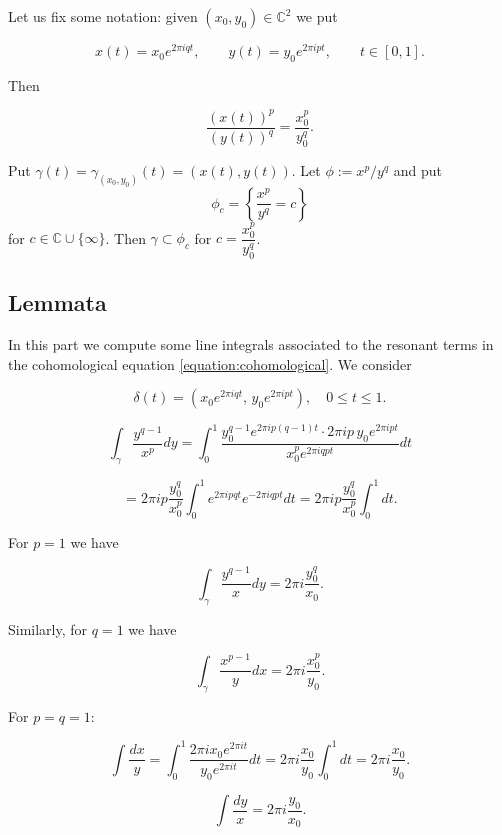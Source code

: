 \documentclass[11pt,a4paper]{amsart}
\theoremstyle{definition}
\begin{document}
Let us fix some notation:
given $(x_0,y_0)\in\mathbb{C}^2$ we put

\[
x(t)=x_0 e^{2\pi i q t},
\qquad
y(t)=y_0 e^{2\pi i p t},
\qquad
t\in[0,1].
\]

Then

\[
\frac{(x(t))^p}{(y(t))^q}
=
\frac{x_0^p}{y_0^q}.
\]

Put $\gamma(t)=\gamma_{(x_0,y_0)}(t)=(x(t),y(t))$.
Let $\phi:=x^p/y^q$ and put
\[
\phi_c=\left\{\frac{x^p}{y^q}=c\right\}
\]
for $c\in\mathbb{C}\cup\{\infty\}$.
Then $\gamma\subset \phi_c$ for $c=\dfrac{x_0^p}{y_0^q}$.
    
    


\subsection{Lemmata}

In this part we compute some  line integrals associated to the resonant terms in the 
cohomological equation \eqref{equation:cohomological}.
We consider 

\[
\delta(t) = (x_0 e^{2\pi i q t},\, y_0 e^{2\pi i p t}), \quad 0 \le t \le 1.
\]

\[
\int_\gamma \frac{y^{q-1}}{x^p} dy
=
\int_0^1
\frac{y_0^{q-1} e^{2\pi i p (q-1)t} \cdot 2\pi i p\, y_0 e^{2\pi i p t}}
{x_0^p e^{2\pi i q p t}} dt
\]

\[
=
2\pi i p \frac{y_0^q}{x_0^p}
\int_0^1
e^{2\pi i p q t}
e^{-2\pi i q p t} dt
=
2\pi i p \frac{y_0^q}{x_0^p}
\int_0^1 dt.
\]

For \(p=1\) we have

\[
\int_\gamma \frac{y^{q-1}}{x} dy
=
2\pi i \frac{y_0^q}{x_0}.
\]

Similarly, for \(q=1\) we have

\[
\int_\gamma \frac{x^{p-1}}{y} dx
=
2\pi i \frac{x_0^p}{y_0}.
\]

For \(p=q=1\):

\[
\int \frac{dx}{y}
=
\int_0^1
\frac{2\pi i x_0 e^{2\pi i t}}
{y_0 e^{2\pi i t}} dt
=
2\pi i \frac{x_0}{y_0}
\int_0^1 dt
=
2\pi i \frac{x_0}{y_0}.
\]

\[
\int \frac{dy}{x}
=
2\pi i \frac{y_0}{x_0}.
\]
\end{document}
